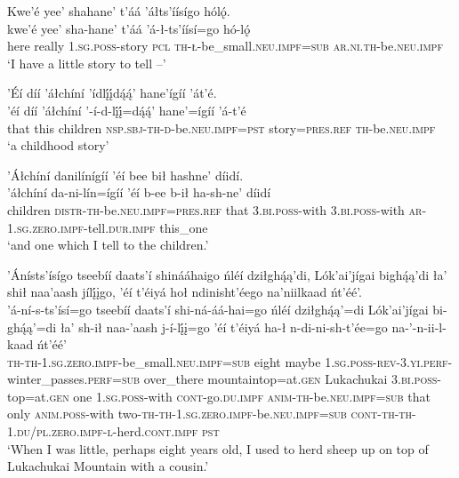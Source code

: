 \ea\label{ex:text6-1-1}
Kwe’é yee’ shahane’ t’áá ’áłts’íísígo hólǫ́.\\
\gll kwe’é	yee’	sha-hane’	t’áá	’á-ł-ts’íísí=go	hó-lǫ́\\
     here	really	1.\textsc{sg}.\textsc{poss}-story	\textsc{pcl}	\textsc{th}-\textsc{ł}-be\_small.\textsc{neu}.\textsc{impf}=\textsc{sub}	\textsc{ar}.\textsc{ni}.\textsc{th}-be.\textsc{neu}.\textsc{impf}\\
\glt `I have a little story to tell --'
\z

\ea\label{ex:text6-1-2}
’Éí díí ’áłchíní ’ídlį́į́dą́ą́’ hane’ígíí ’át’é.\\
\gll ’éí	díí	’áłchíní	’-í-d-lį́į́=dą́ą́’	hane’=ígíí	’á-t’é\\
     that	this	children	\textsc{nsp}.\textsc{sbj}-\textsc{th}-\textsc{d}-be.\textsc{neu}.\textsc{impf}=\textsc{pst}	story=\textsc{pres}.\textsc{ref}	\textsc{th}-be.\textsc{neu}.\textsc{impf}\\
\glt `a childhood story'
\z

\ea\label{ex:text6-1-3}
’Áłchíní danilínígíí ’éí bee bił hashne’ díidí.\\
\gll ’áłchíní	da-ni-lín=ígíí	’éí	b-ee	b-ił	ha-sh-ne’	díidí\\
     children	\textsc{distr}-\textsc{th}-be.\textsc{neu}.\textsc{impf}=\textsc{pres}.\textsc{ref}	that	3.\textsc{bi}.\textsc{poss}-with	3.\textsc{bi}.\textsc{poss}-with	\textsc{ar}-1.\textsc{sg}.\textsc{zero}.\textsc{impf}-tell.\textsc{dur}.\textsc{impf}	this\_one\\
\glt `and one which I tell to the children.'
\z

\ea\label{ex:text6-1-4}
’Ánísts’ísígo tseebíí daats’í shinááhaigo ńléí dziłghą́ą’di, Lók’ai’jígai bighą́ą’di ła’ shił naa’aash jílį́įgo, ’éí t’éiyá hoł ndinisht’éego na’niilkaad ńt’éé’.\\
\gll ’á-ní-s-ts’ísí=go	tseebíí	daats’í	shi-ná-áá-hai=go	ńléí	dziłghą́ą’=di	Lók’ai’jígai	bi-ghą́ą’=di	ła’	sh-ił	naa-’aash	j-í-lį́į=go	’éí	t’éiyá	ha-ł	n-di-ni-sh-t’ée=go	na-’-n-ii-l-kaad	ńt’éé’\\
     \textsc{th}-\textsc{th}-1.\textsc{sg}.\textsc{zero}.\textsc{impf}-be\_small.\textsc{neu}.\textsc{impf}=\textsc{sub}	eight	maybe	1.\textsc{sg}.\textsc{poss}-\textsc{rev}-3.\textsc{yi}.\textsc{perf}-winter\_passes.\textsc{perf}=\textsc{sub}	over\_there	mountaintop=at.\textsc{gen}	Lukachukai	3.\textsc{bi}.\textsc{poss}-top=at.\textsc{gen}	one	1.\textsc{sg}.\textsc{poss}-with	\textsc{cont}-go.\textsc{du}.\textsc{impf}	\textsc{anim}-\textsc{th}-be.\textsc{neu}.\textsc{impf}=\textsc{sub}	that	only	\textsc{anim}.\textsc{poss}-with	two-\textsc{th}-\textsc{th}-1.\textsc{sg}.\textsc{zero}.\textsc{impf}-be.\textsc{neu}.\textsc{impf}=\textsc{sub}	\textsc{cont}-\textsc{th}-\textsc{th}-1.\textsc{du}/\textsc{pl}.\textsc{zero}.\textsc{impf}-\textsc{l}-herd.\textsc{cont}.\textsc{impf}	\textsc{pst}\\
\glt `When I was little, perhaps eight years old, I used to herd sheep up on top of Lukachukai Mountain with a cousin.'
\z

